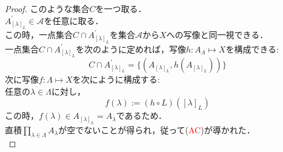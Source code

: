 \documentclass{jarticle}
\begin{document}
\begin{proof}
	このような集合$C$を一つ取る．\\
	$A_{[\lambda]_{L}}^{'} \in \mathcal{A}$を任意に取る．\\
	この時，一点集合$C \cap A_{[\lambda]_{L}}^{'}$を集合$\mathcal{A}$から$X$への写像と同一視できる．\\
	一点集合$C \cap A_{[\lambda]_{L}}^{'}$を次のように定めれば，写像$h:A_\Lambda \mapsto X$を構成できる:\\
	$$
	C \cap A_{[\lambda]_{L}}^{'} = \{ (A_{[\lambda]_{L}} , h(A_{[\lambda]_{L}})) \}
	$$
	次に写像$f : \Lambda \mapsto X$を次にように構成する:\\
	任意の$\lambda \in \Lambda$に対し，\\
	$$
	f(\lambda) := (h \circ L)([\lambda]_{L})
	$$
	この時，$f(\lambda) \in A_{[\lambda]_{L}}=A_\lambda$であるため．\\
	直積$\prod\limits_{\lambda \in \Lambda}A_\lambda$が空でないことが得られ，従って(\textcolor{red}{AC})が導かれた．\\
\end{proof}
\end{document}
